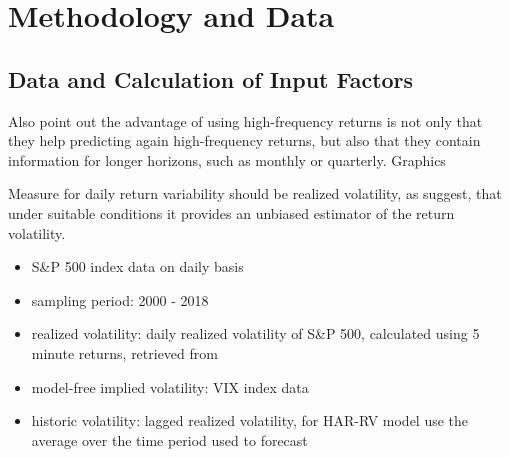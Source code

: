 
\section{Methodology and Data}

\subsection{Data and Calculation of Input Factors}
Also \citeauthor{andersen2003} point out the advantage of using high-frequency returns is not only that they help predicting again high-frequency returns, but also that they contain information for longer horizons, such as monthly or quarterly. 
Graphics


%
%

Measure for daily return variability should be realized volatility, as \citeauthor{andersen2001} suggest, that under suitable conditions it provides an unbiased estimator of the return volatility. 


\begin{itemize}\itemsep0pt
\item S\&P 500 index data on daily basis
\item sampling period: 2000 - 2018
\item realized volatility: daily realized volatility of S\&P 500, calculated using 5 minute returns, retrieved from \citeauthor{heber2009}
\item model-free implied volatility: VIX index data
\item historic volatility: lagged realized volatility, for HAR-RV model use the average over the time period used to forecast
\end{itemize}


